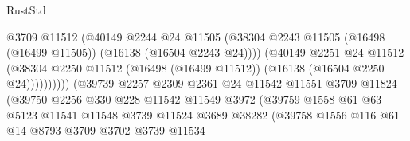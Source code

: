 \begin{lexlean}{RustStd}
\begin{coremodule}
                                          @3709
                                          @11512
                                          (@40149
                                            @2244
                                            @24
                                            @11505
                                            (@38304
                                              @2243
                                              @11505
                                              (@16498 (@16499 @11505))
                                              (@16138 (@16504 @2243 @24))))
                                          (@40149
                                            @2251
                                            @24
                                            @11512
                                            (@38304
                                              @2250
                                              @11512
                                              (@16498 (@16499 @11512))
                                              (@16138 (@16504 @2250 @24))))))))))
                              (@39739
                                @2257
                                @2309
                                @2361
                                @24
                                @11542
                                @11551
                                @3709
                                @11824
                                (@39750
                                  @2256
                                  @330
                                  @228
                                  @11542
                                  @11549
                                  @3972
                                  (@39759
                                    @1558
                                    @61
                                    @63
                                    @5123
                                    @11541
                                    @11548
                                    @3739
                                    @11524
                                    @3689
                                    @38282
                                    (@39758
                                      @1556
                                      @116
                                      @61
                                      @14
                                      @8793
                                      @3709
                                      @3702
                                      @3739
                                      @11534

\end{coremodule}
\end{lexlean}
